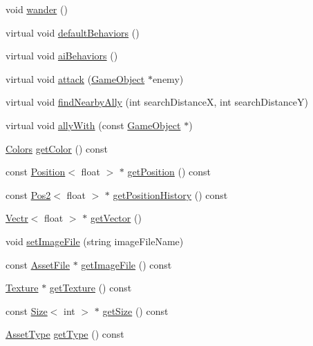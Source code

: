 \begin{DoxyCompactItemize}
\item 
void \hyperlink{class_game_object_a372fee85f1892fd1fe258061dfb13269}{wander} ()
\item 
virtual void \hyperlink{class_game_object_a565a3950ea0af84bf7515bdb77abf51a}{default\-Behaviors} ()
\item 
virtual void \hyperlink{class_game_object_a43862b5d602a0fec32b686ab8586e886}{ai\-Behaviors} ()
\item 
virtual void \hyperlink{class_game_object_a87cfdf508b01dd9653716a5b4f4d7571}{attack} (\hyperlink{class_game_object}{Game\-Object} $\ast$enemy)
\item 
virtual void \hyperlink{class_game_object_a6bfde6f1f94ce0bf66f598dc53a75551}{find\-Nearby\-Ally} (int search\-Distance\-X, int search\-Distance\-Y)
\item 
virtual void \hyperlink{class_game_object_a20ca237d244a3eeb34500e0134d60eb1}{ally\-With} (const \hyperlink{class_game_object}{Game\-Object} $\ast$)
\item 
\hyperlink{_character_data_8h_a55ecd4f2ec2ebfe8d5b0163e4ac2a967}{Colors} \hyperlink{class_game_object_afa75c94bc4f7f52a48d000ef0803ec59}{get\-Color} () const 
\item 
const \hyperlink{struct_position}{Position}$<$ float $>$ $\ast$ \hyperlink{class_game_object_a8037270ed22a6c599a40610b188bf5d8}{get\-Position} () const 
\item 
const \hyperlink{struct_pos2}{Pos2}$<$ float $>$ $\ast$ \hyperlink{class_game_object_ac9c2137750ca7960047ad13fe9bb1b38}{get\-Position\-History} () const 
\item 
\hyperlink{struct_vectr}{Vectr}$<$ float $>$ $\ast$ \hyperlink{class_game_object_a12e8f3985a6a4a63dc5be822d50418a1}{get\-Vector} ()
\item 
void \hyperlink{class_game_object_a63e1c98f0e834bc9572b99957ebf5d4c}{set\-Image\-File} (string image\-File\-Name)
\item 
const \hyperlink{struct_asset_file}{Asset\-File} $\ast$ \hyperlink{class_game_object_a828768b425b6f845409a79f71f17d624}{get\-Image\-File} () const 
\item 
\hyperlink{_default_config_8h_a9ca20d8445e7d830c262f5ec4bb5d1bf}{Texture} $\ast$ \hyperlink{class_game_object_af0308820bacc8fa87cf985b78c5814fc}{get\-Texture} () const 
\item 
const \hyperlink{struct_size}{Size}$<$ int $>$ $\ast$ \hyperlink{class_game_object_a37fa422cde617a2f0c584193bf83e4a5}{get\-Size} () const 
\item 
\hyperlink{_asset_file_i_o_8h_a72d924d1cb8e1544b6d5198e98d52ca9}{Asset\-Type} \hyperlink{class_game_object_a106ef712578d9d9e82bf4df9e29245c5}{get\-Type} () const 

\end{DoxyCompactItemize}
